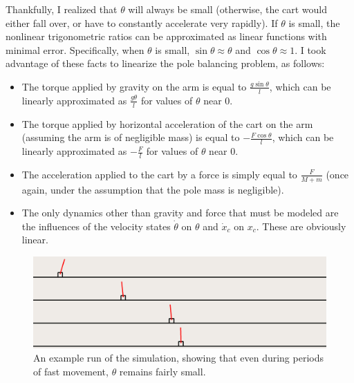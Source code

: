 \documentclass[11pt]{article}
\begin{document}
Thankfully, I realized that $\theta$ will always be small (otherwise, the cart would either fall over, or have to constantly accelerate very rapidly). If $\theta$ is small, the nonlinear trigonometric ratios can be approximated as linear functions with minimal error. Specifically, when $\theta$ is small, $\sin \theta \approx \theta$ and $\cos \theta \approx 1$. I took advantage of these facts to linearize the pole balancing problem, as follows:

\begin{itemize}
    \item The torque applied by gravity on the arm is equal to $\displaystyle \frac{\displaystyle g \sin \theta}{\displaystyle l}$, which can be linearly approximated as $\displaystyle \frac{\displaystyle g \theta}{\displaystyle l}$ for values of $\theta$ near 0.
    \item The torque applied by horizontal acceleration of the cart on the arm (assuming the arm is of negligible mass) is equal to $\displaystyle - \frac{\displaystyle F \cos \theta}{\displaystyle l}$, which can be linearly approximated as $\displaystyle - \frac{\displaystyle F}{\displaystyle l}$ for values of $\theta$ near 0.
    \item The acceleration applied to the cart by a force is simply equal to $\displaystyle \frac{\displaystyle F}{\displaystyle M + m}$ (once again, under the assumption that the pole mass is negligible).
    \item The only dynamics other than gravity and force that must be modeled are the influences of the velocity states $\dot \theta$ on $\theta$ and $\dot x _c$ on $x _c$. These are obviously linear.
\end{itemize}

\begin{figure}[ht]
    \centering
    \includegraphics[width=\textwidth]{animation}
    \caption{\label{animation} An example run of the simulation, showing that even during periods of fast movement, $\theta$ remains fairly small.}
\end{figure}
\end{document}
